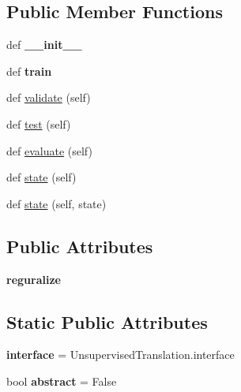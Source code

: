 \subsection*{Public Member Functions}
\begin{DoxyCompactItemize}
\item 
def {\bfseries \+\_\+\+\_\+init\+\_\+\+\_\+}\hypertarget{classexperiments_1_1MergedCurriculumTranslation_a9f2daa6e845b3562097c224c57a7b752}{}\label{classexperiments_1_1MergedCurriculumTranslation_a9f2daa6e845b3562097c224c57a7b752}

\item 
def {\bfseries train}\hypertarget{classexperiments_1_1MergedCurriculumTranslation_a05c0be7c2ed4a43cb84409c336f2a43f}{}\label{classexperiments_1_1MergedCurriculumTranslation_a05c0be7c2ed4a43cb84409c336f2a43f}

\item 
def \hyperlink{classexperiments_1_1MergedCurriculumTranslation_ad0f290d29438846fce55e6fcca7d135b}{validate} (self)
\item 
def \hyperlink{classexperiments_1_1MergedCurriculumTranslation_a965ce3d442924c0c92999e76d2cc744f}{test} (self)
\item 
def \hyperlink{classexperiments_1_1MergedCurriculumTranslation_aaa6b0b958add43289836e072d79eff5b}{evaluate} (self)
\item 
def \hyperlink{classexperiments_1_1MergedCurriculumTranslation_acc0cb9dfc9e83e461d64aca96046c592}{state} (self)
\item 
def \hyperlink{classexperiments_1_1MergedCurriculumTranslation_a5dd0db1db771158f5baa8faafd78fd03}{state} (self, state)
\end{DoxyCompactItemize}
\subsection*{Public Attributes}
\begin{DoxyCompactItemize}
\item 
{\bfseries reguralize}\hypertarget{classexperiments_1_1MergedCurriculumTranslation_aae8aeee74af48c305f482acfe7f08c57}{}\label{classexperiments_1_1MergedCurriculumTranslation_aae8aeee74af48c305f482acfe7f08c57}

\end{DoxyCompactItemize}
\subsection*{Static Public Attributes}
\begin{DoxyCompactItemize}
\item 
{\bfseries interface} = Unsupervised\+Translation.\+interface\hypertarget{classexperiments_1_1MergedCurriculumTranslation_ae45acf0b47e0a61e43936c7c40568f4e}{}\label{classexperiments_1_1MergedCurriculumTranslation_ae45acf0b47e0a61e43936c7c40568f4e}

\item 
bool {\bfseries abstract} = False\hypertarget{classexperiments_1_1MergedCurriculumTranslation_a33f79d34a935056931595267684513a6}{}\label{classexperiments_1_1MergedCurriculumTranslation_a33f79d34a935056931595267684513a6}

\end{DoxyCompactItemize}

